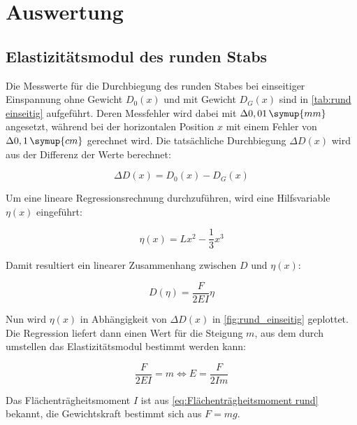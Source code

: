 \section{Auswertung}
\label{sec:Auswertung}

\subsection{Elastizitätsmodul des runden Stabs}  %
\label{sec:Elastizitätsmodul rund}

Die Messwerte für die Durchbiegung des runden Stabes bei einseitiger Einspannung ohne Gewicht $D_{0}(x)$
und mit Gewicht $D_{G}(x)$ sind in \autoref{tab:rund einseitig} aufgeführt.
Deren Messfehler wird dabei mit $\Delta 0,01\,\symup{mm}$ angesetzt, während bei der horizontalen Position
$x$ mit einem Fehler von $\Delta 0,1\,\symup{cm}$ gerechnet wird.
Die tatsächliche Durchbiegung $\Delta D(x)$ wird aus der Differenz der Werte berechnet:

\begin{equation}
  \Delta D(x)= D_{0}(x)-D_{G}(x)
  \label{eq:Delta D}
\end{equation}


Um eine lineare Regressionsrechnung durchzuführen, wird eine Hilfsvariable $\eta(x)$ eingeführt:

\begin{equation}
  \eta(x)=Lx^{2}-\frac{1}{3}x^{3}
  \label{eq:eta einseitig rund}
\end{equation}

Damit resultiert ein linearer Zusammenhang zwischen $D$ und $\eta(x)$:

\begin{equation}
  D(\eta)=\frac{F}{2EI}\eta
  \label{eq:Geradengleichung}
\end{equation}

Nun wird $\eta(x)$ in Abhängigkeit von $\Delta D(x)$ in \autoref{fig:rund_einseitig} geplottet.
Die Regression liefert dann einen Wert für die Steigung $m$, aus dem durch umstellen das Elastizitätsmodul bestimmt werden kann:

\begin{equation}
  \frac{F}{2EI}=m \Leftrightarrow E=\frac{F}{2Im}
  \label{eq:Elastizitätsmodul aus Steigung}
\end{equation}

Das Flächenträgheitsmoment $I$ ist aus \autoref{eq:Flächenträgheitsmoment rund} bekannt, die Gewichtskraft
bestimmt sich aus $F=mg$.

